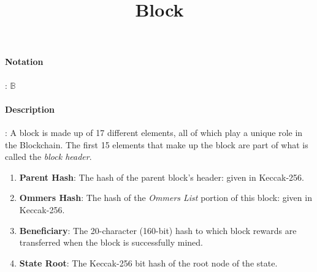 \documentclass[10pt,a4paper,oneside]{scrartcl}
\author{}
\title{Block}
\date{}
\begin{document}
\maketitle
\paragraph{Notation}: $\mathbb{B}$
\paragraph{Description}: A block is made up of 17 different elements, all of which play a unique role in the Blockchain. The first 15 elements that make up the block are part of what is called the \textsl{block header}. 

\begin{enumerate}
	\item \textbf{Parent Hash}: The hash of the parent block's header: given in Keccak-256.
	\item \textbf{Ommers Hash}: The hash of the \textsl{Ommers List} portion of this block: given in Keccak-256.
	\item \textbf{Beneficiary}: The 20-character (160-bit) hash to which block rewards are transferred when the block is successfully mined.
	\item \textbf{State Root}: The Keccak-256 bit hash of the root node of the state. 


\end{enumerate}
\end{document}
